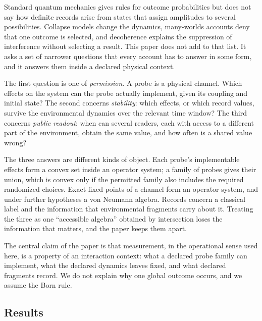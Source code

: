 \documentclass[12pt,a4paper]{article}
\begin{document}
Standard quantum mechanics gives rules for outcome probabilities but does not say how definite records arise from states that assign amplitudes to several possibilities. Collapse models change the dynamics, many-worlds accounts deny that one outcome is selected, and decoherence explains the suppression of interference without selecting a result. This paper does not add to that list. It asks a set of narrower questions that every account has to answer in some form, and it answers them inside a declared physical context.

The first question is one of \emph{permission}. A probe is a physical channel. Which effects on the system can the probe actually implement, given its coupling and initial state? The second concerns \emph{stability}: which effects, or which record values, survive the environmental dynamics over the relevant time window? The third concerns \emph{public readout}: when can several readers, each with access to a different part of the environment, obtain the same value, and how often is a shared value wrong?

The three answers are different kinds of object. Each probe's implementable effects form a convex set inside an operator system; a family of probes gives their union, which is convex only if the permitted family also includes the required randomized choices. Exact fixed points of a channel form an operator system, and under further hypotheses a von Neumann algebra. Records concern a classical label and the information that environmental fragments carry about it. Treating the three as one ``accessible algebra'' obtained by intersection loses the information that matters, and the paper keeps them apart.

The central claim of the paper is that measurement, in the operational sense used here, is a property of an interaction context: what a declared probe family can implement, what the declared dynamics leaves fixed, and what declared fragments record. We do not explain why one global outcome occurs, and we assume the Born rule.

\subsection{Results}
\end{document}
